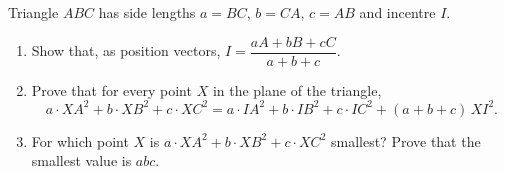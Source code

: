 Triangle $ABC$ has side lengths $a=BC$, $b=CA$, $c=AB$ and incentre $I$.
\begin{enumerate}
\item[(a)] Show that, as position vectors, $I=\dfrac{aA+bB+cC}{a+b+c}$.
\item[(b)] Prove that for every point $X$ in the plane of the triangle,
\[a\cdot XA^2+b\cdot XB^2+c\cdot XC^2=a\cdot IA^2+b\cdot IB^2+c\cdot IC^2+(a+b+c)\,XI^2 .\]
\item[(c)] For which point $X$ is $a\cdot XA^2+b\cdot XB^2+c\cdot XC^2$ smallest? Prove that the smallest value is $abc$.
\end{enumerate}
